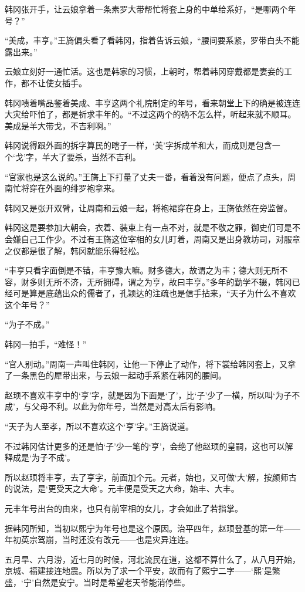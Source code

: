 韩冈张开手，让云娘拿着一条素罗大带帮忙将套上身的中单给系好，“是哪两个年号？”

“美成，丰亨。”王旖偏头看了看韩冈，指着告诉云娘，“腰间要系紧，罗带白头不能露出来。”

云娘立刻好一通忙活。这也是韩家的习惯，上朝时，帮着韩冈穿戴都是妻妾的工作，都不让使女插手。

韩冈啧着嘴品鉴着美成、丰亨这两个礼院制定的年号，看来朝堂上下的确是被连连大灾给吓怕了，都是祈求丰年的。“不过这两个的确不怎么样，听起来就不顺耳。美成是羊大带戈，不吉利啊。”

韩冈说得跟外面的拆字算民的瞎子一样，‘美’字拆成羊和大，而成则是包含一个‘戈’字，羊大了要杀，当然不吉利。

“官家也是这么说的。”王旖上下打量了丈夫一番，看着没有问题，便点了点头，周南忙将穿在外面的绯罗袍拿来。

韩冈又是张开双臂，让周南和云娘一起，将袍裙穿在身上，王旖依然在旁监督。

韩冈这是要参加大朝会，衣着、装束上有一点不对，就是不敬之罪，御史们可是不会嫌自己工作少。不过有王旖这位宰相的女儿盯着，周南又是出身教坊司，对服章之仪都是很了解，韩冈就能乐得轻松。

“丰亨只看字面倒是不错，丰亨豫大嘛。财多德大，故谓之为丰；德大则无所不容，财多则无所不济，无所拥碍，谓之为亨，故曰丰亨。”多年的勤学不辍，韩冈已经可是算是底蕴出众的儒者了，孔颖达的注疏也是信手拈来，“天子为什么不喜欢这个年号？”

“为子不成。”

韩冈一拍手，“难怪！”

“官人别动。”周南一声叫住韩冈，让他一下停止了动作，将下裳给韩冈套上，又拿了一条黑色的犀带出来，与云娘一起动手系紧在韩冈的腰间。

赵顼不喜欢丰亨中的‘亨’字，就是因为下面是‘了’，比‘子’少了一横，所以叫‘为子不成’，与父母不利。以此为你年号，当然是对高太后有影响。

“天子为人至孝，所以不喜欢这个‘亨’字。”王旖说道。

不过韩冈估计更多的还是怕‘子’少一笔的‘亨’，会绝了他赵顼的皇嗣，这也可以解释成是‘为子不成’。

所以赵顼将丰亨，去了亨字，前面加个元。元者，始也，又可做‘大’解，按颜师古的说法，是‘更受天之大命’。元丰便是受天之大命，始丰、大丰。

元丰年号出台的由来，也只有前宰相的女儿，才会如此了若指掌。

据韩冈所知，当初以熙宁为年号也是这个原因。治平四年，赵顼登基的第一年——年初英宗驾崩，当时还没有改元——也是灾异连连。

五月旱、六月涝，近七月的时候，河北流民在道，这都不算什么了，从八月开始，京城、福建接连地震。所以为了求一个平安，故而有了熙宁二字——‘熙’是繁盛，‘宁’自然是安宁。当时是希望老天爷能消停些。

